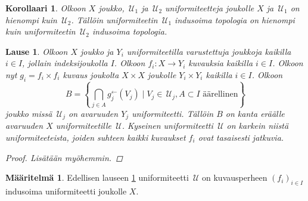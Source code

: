 \documentclass[12pt,a4paper,leqno]{report}
\newcommand{\N}{\mathbb{N}}
\newcommand{\U}{\,\mathcal{U}}
\theoremstyle{plain}
\newtheorem{lause}[equation]{Lause}
\newtheorem{kor}[equation]{Korollaari}
\theoremstyle{definition}
\newtheorem{maar}[equation]{Määritelmä}
\theoremstyle{remark}
\begin{document}
\begin{kor}
Olkoon $X$ joukko, $\U_1$ ja $\U_2$ uniformiteetteja joukolle $X$ ja 
$\U_1$ on hienompi kuin $\U_2$. 
Tällöin uniformiteetin $\U_1$ indusoima topologia on hienompi kuin 
uniformiteetin $\U_2$ indusoima topologia.
\end{kor}
\begin{lause}\label{kuvausperheen indusoima lause}
Olkoon $X$ joukko ja $Y_i$ uniformiteetilla varustettuja joukkoja kaikilla $i\in I$, jollain indeksijoukolla $I$. 
Olkoon $f_i\colon X\rightarrow Y_i$ kuvauksia kaikilla $i\in I$. 
Olkoon nyt $g_i=f_i\times f_i$ kuvaus joukolta $X\times X$ joukolle $Y_i\times Y_i$ 
kaikilla $i\in I$.
Olkoon 
$$B=\left\{\bigcap_{j\in A}g^{\leftarrow}_{j}(V_{j})
\mid V_{j} \in\U_{j},A\subset I\text{ äärellinen}\right\}$$
joukko missä $\U_{j}$ on avaruuden $Y_{j}$ uniformiteetti.
Tällöin $B$ on kanta eräälle avaruuden $X$ uniformiteetille $\U$. 
Kyseinen uniformiteetti $\U$ on karkein niistä uniformiteeteista, joiden suhteen kaikki kuvaukset $f_i$ ovat tasaisesti jatkuvia.
\begin{proof}
Lisätään myöhemmin. %
\end{proof}
\end{lause}
\begin{maar}\label{kuvausperheen indusoima}
Edellisen lauseen \ref{kuvausperheen indusoima lause} uniformiteetti $\U$ on kuvausperheen $(f_i)_{i\in I}$ indusoima uniformiteetti joukolle $X$.
\end{maar}
\end{document}
